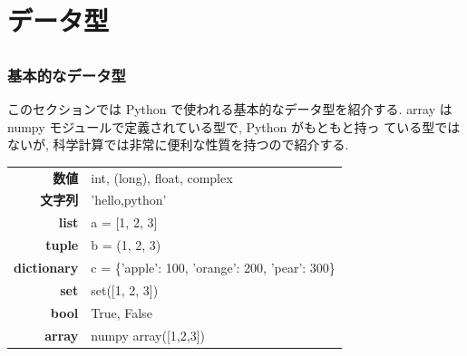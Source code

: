 \section{データ型}
\subsection*{\redm\whiteb\greenb}

\begin{frame}[t, fragile]
\frametitle{基本的なデータ型}

\alert{このセクションでは Python で使われる基本的なデータ型を紹介する. } array は numpy モジュールで定義されている型で, Python がもともと持っ
ている型ではないが, 科学計算では非常に便利な性質を持つので紹介する. 

\begin{table}[hb]
 \begin{tabular}{r|l} 
  \textbf{数値}       & int, (long), float, complex \\
  \textbf{文字列}     & 'hello,python' \\
  \textbf{list}       & a = [1, 2, 3] \\
  \textbf{tuple}      & b = (1, 2, 3) \\
  \textbf{dictionary} & c = \{'apple': 100, 'orange': 200, 'pear': 300\} \\
  \textbf{set}        & set([1, 2, 3]) \\
  \textbf{bool}       & True, False \\
  \textbf{array}      & numpy array([1,2,3]) \\
 \end{tabular}
\end{table}

\end{frame}

